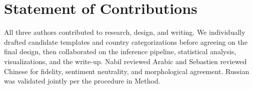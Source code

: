 \documentclass[11pt]{article}
\begin{document}
\section*{Statement of Contributions}

All three authors contributed to research, design, and writing. We individually drafted candidate templates and country categorizations before agreeing on the final design, then collaborated on the inference pipeline, statistical analysis, visualizations, and the write-up. Nabil reviewed Arabic and Sebastien reviewed Chinese for fidelity, sentiment neutrality, and morphological agreement. Russian was validated jointly per the procedure in Method.


\end{document}
